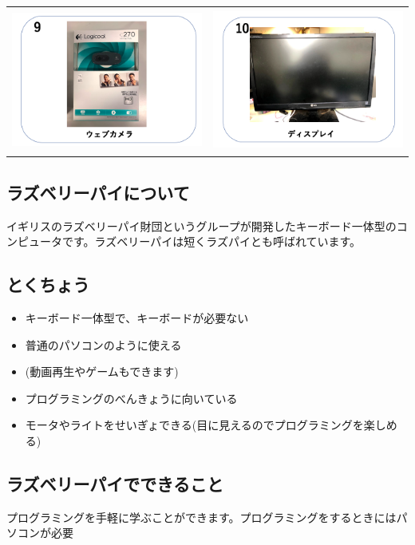 \documentclass[a4paper,12pt]{jarticle}
\begin{document}
\begin{tabular}{cc}
  \includegraphics[width=6.488cm,height=4.697cm]{textbook-img002.png}
   &
  \includegraphics[width=6.488cm,height=4.697cm]{textbook-img001.png} \\
\end{tabular}

\subsection{ラズベリーパイについて}
イギリスのラズベリーパイ財団というグループが開発したキーボード一体型のコンピュータです。ラズベリーパイは短くラズパイとも呼ばれています。

\subsection{とくちょう}
\begin{itemize}
  \item キーボード一体型で、キーボードが必要ない
  \item 普通のパソコンのように使える
  \item (動画再生やゲームもできます)
  \item
        プログラミングのべんきょうに向いている
  \item
        モータやライトをせいぎょできる(目に見えるのでプログラミングを楽しめる)
\end{itemize}
\subsection{ラズベリーパイでできること}
プログラミングを手軽に学ぶことができます。プログラミングをするときにはパソコンが必要
\end{document}
